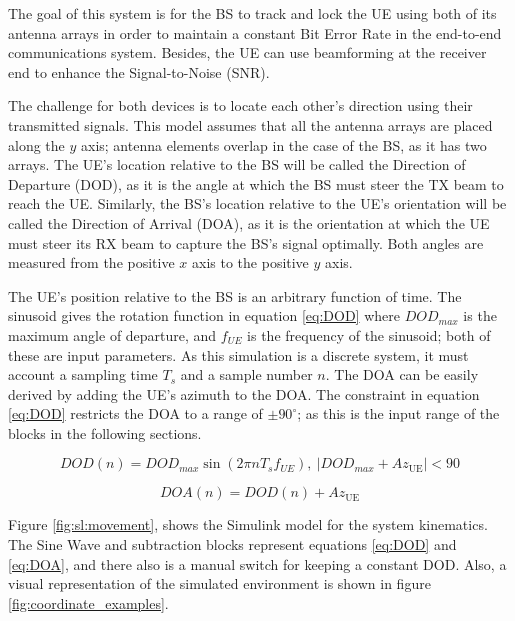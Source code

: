 \documentclass[12pt,a4paper]{report}
\newcommand{\Azue}{Az_{\text{UE}}}
\begin{document}
The goal of this system is for the BS to track and lock the UE using both of its antenna arrays in order to maintain a constant Bit Error Rate in the end-to-end communications system. Besides, the UE can use beamforming at the receiver end to enhance the Signal-to-Noise (SNR).

The challenge for both devices is to locate each other's direction using their transmitted signals. This model assumes that all the antenna arrays are placed along the $y$ axis; antenna elements overlap in the case of the BS, as it has two arrays. The UE's location relative to the BS will be called the Direction of Departure (DOD), as it is the angle at which the BS must steer the TX beam to reach the UE. Similarly, the BS's location relative to the UE's orientation will be called the Direction of Arrival (DOA), as it is the orientation at which the UE must steer its RX beam to capture the BS's signal optimally. Both angles are measured from the positive $x$ axis to the positive $y$ axis.

The UE's position relative to the BS is an arbitrary function of time. The sinusoid gives the rotation function in equation \ref{eq:DOD} where $DOD_{max}$ is the maximum angle of departure, and $f_{UE}$ is the frequency of the sinusoid; both of these are input parameters. As this simulation is a discrete system, it must account a sampling time $T_{s}$ and a sample number $n$. The DOA can be easily derived by adding the UE's azimuth to the DOA. The constraint in equation \ref{eq:DOD} restricts the DOA to a range of $\pm 90^\circ$; as this is the input range of the blocks in the following sections. 

\begin{equation}
    DOD(n) = DOD_{max} \sin(2 \pi n T_{s} f_{UE}), \:|DOD_{max} + \Azue| < 90
    \label{eq:DOD}
\end{equation}

\begin{equation}
    DOA(n) = DOD(n) + \Azue
    \label{eq:DOA}
\end{equation}

Figure \ref{fig:sl:movement}, shows the Simulink model for the system kinematics. The Sine Wave and subtraction blocks represent equations \ref{eq:DOD} and \ref{eq:DOA}, and there also is a manual switch for keeping a constant DOD. Also, a visual representation of the simulated environment is shown in figure \ref{fig:coordinate_examples}.
\end{document}
